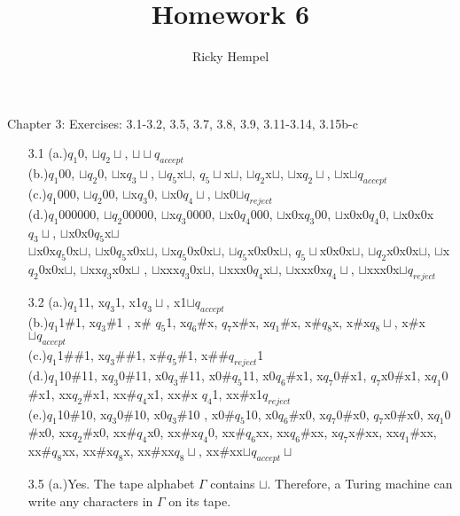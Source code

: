 \documentclass[10pt] {article}
\title{Homework 6 }
\author{Ricky Hempel}
\begin{document}
\maketitle
\begin{center}
Chapter 3: Exercises: 3.1-3.2, 3.5, 3.7, 3.8, 3.9, 3.11-3.14, 3.15b-c
\end{center}
\begin{enumerate}
\item[3.1](a.)$q_1$0, $\sqcup q_2 \sqcup$, $\sqcup \sqcup q_{accept}$\\
(b.)$q_1$00, $\sqcup q_2$0, $\sqcup$x$q_3 \sqcup$, $\sqcup q_5$x$\sqcup$, $q_5 \sqcup$x$\sqcup$, $\sqcup q_2$x$\sqcup$, $\sqcup$x$q_2 \sqcup$, $\sqcup$x$\sqcup q_{accept}$\\
(c.)$q_1$000, $\sqcup q_2$00, $\sqcup$x$q_3$0, $\sqcup$x0$q_4 \sqcup$, $\sqcup$x0$\sqcup q_{reject}  $ \\
(d.)$q_1$000000, $ \sqcup q_2 $00000, $ \sqcup $x$ q_3 $0000, $ \sqcup $x0$ q_4 $000, $ \sqcup $x0x$ q_3 $00, $ \sqcup $x0x0$q_4$0, $\sqcup$x0x0x$q_3 \sqcup$, $\sqcup$x0x0$q_5$x$\sqcup$\\ $\sqcup$x0x$q_5$0x$\sqcup$, $\sqcup$x0$q_5$x0x$\sqcup$, $\sqcup$x$q_5$0x0x$\sqcup$, $\sqcup q_5$x0x0x$\sqcup$, $q_5 \sqcup$x0x0x$\sqcup$, $\sqcup q_2$x0x0x$\sqcup$, $\sqcup$x$q_2$0x0x$\sqcup$, $\sqcup$xx$q_3$x0x$\sqcup$ , $\sqcup$xxx$q_3$0x$\sqcup$, $\sqcup$xxx0$q_4$x$\sqcup$, $\sqcup$xxx0x$q_4 \sqcup$, $\sqcup$xxx0x$\sqcup q_{reject}$
\item[3.2]
(a.)$q_1$11, x$q_3$1, x1$q_3 \sqcup$, x1$\sqcup q_{accept}$\\
(b.)$q_1$1$\#$1, x$q_3 \#$1 , x$\#$ $q_5$1, x$q_6 \#$x, $q_7$x$\#$x, x$q_1 \#$x, x$\# q_8$x, x$\#$x$q_8 \sqcup$, x$\#$x$\sqcup q_{accept}$ \\
(c.)$q_1$1$\# \#$1, x$q_3 \# \#$1, x$\# q_5 \#$1, x$\# \# q_{reject}$1\\
(d.)$q_1$10$\#$11, x$q_3$0$\#$11, x0$q_3 \#$11, x0$\# q_5$11, x0$q_6 \#$x1, x$q_7$0$\#$x1, $q_7$x0$\#$x1, x$q_1$0$\#$x1, xx$q_2 \#$x1, xx$\# q_4$x1, xx$\#$x $q_4$1, xx$\#$x1$q_{reject}$\\
(e.)$q_1$10$\#$10, x$q_3$0$\#$10, x0$q_3 \#$10 , x0$\# q_5$10, x0$q_6 \#$x0, x$q_7$0$\#$x0, $q_7$x0$\#$x0, x$q_1$0$\#$x0, xx$q_2 \#$x0, xx$\# q_4$x0, xx$\#$x$q_4$0, xx$\# q_6$xx, xx$q_6 \#$xx, x$q_7$x$\#$xx, xx$q_1 \#$xx, xx$\# q_8$xx, xx$\#$x$q_8$x, xx$\#$xx$q_8 \sqcup$, xx$\#$xx$\sqcup q_{accept} \sqcup$
\item[3.5]
(a.)Yes. The tape alphabet $\Gamma$ contains $\sqcup$. Therefore, a Turing machine can write any characters in $\Gamma$ on its tape.\\

\end{enumerate}
\end{document}
